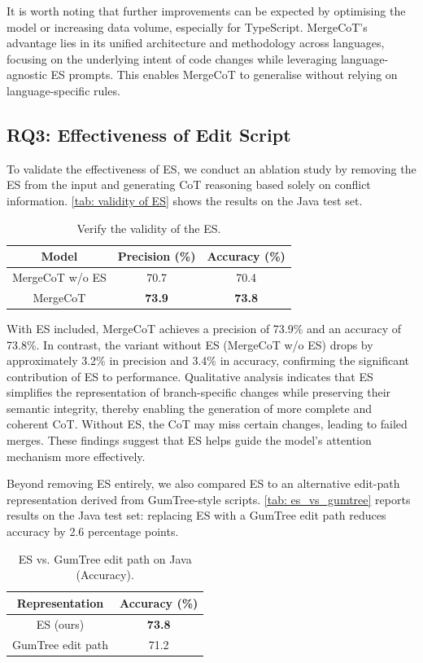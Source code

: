 \documentclass[sigconf,review,anonymous]{acmart}
\begin{document}
It is worth noting that further improvements can be expected by optimising the model or increasing data volume, especially for TypeScript. MergeCoT’s advantage lies in its unified architecture and methodology across languages, focusing on the underlying intent of code changes while leveraging language-agnostic ES prompts. This enables MergeCoT to generalise without relying on language-specific rules.

\subsection{RQ3: Effectiveness of Edit Script}
To validate the effectiveness of ES, we conduct an ablation study by removing the ES from the input and generating CoT reasoning based solely on conflict information. \autoref{tab: validity of ES} shows the results on the Java test set.

\begin{table}[H]
\caption{Verify the validity of the ES.}
\begin{tabular}{ccc}
\hline
Model           & Precision (\%) & Accuracy (\%) \\ \hline
MergeCoT w/o ES & 70.7           & 70.4          \\
MergeCoT        & \textbf{73.9}  & \textbf{73.8}   \\ \hline
\end{tabular}
\label{tab: validity of ES}
\end{table}

With ES included, MergeCoT achieves a precision of 73.9\% and an accuracy of 73.8\%. In contrast, the variant without ES (MergeCoT w/o ES) drops by approximately 3.2\% in precision and 3.4\% in accuracy, confirming the significant contribution of ES to performance. Qualitative analysis indicates that ES simplifies the representation of branch-specific changes while preserving their semantic integrity, thereby enabling the generation of more complete and coherent CoT. Without ES, the CoT may miss certain changes, leading to failed merges. These findings suggest that ES helps guide the model’s attention mechanism more effectively.

Beyond removing ES entirely, we also compared ES to an alternative edit-path representation derived from GumTree-style scripts. \autoref{tab: es_vs_gumtree} reports results on the Java test set: replacing ES with a GumTree edit path reduces accuracy by 2.6 percentage points.

\begin{table}[H]
\caption{ES vs. GumTree edit path on Java (Accuracy).}
\centering
\begin{tabular}{cc}
\hline
Representation        & Accuracy (\%) \\ \hline
ES (ours)             & \textbf{73.8} \\
GumTree edit path     & 71.2          \\ \hline
\end{tabular}
\label{tab: es_vs_gumtree}
\end{table}
\end{document}
